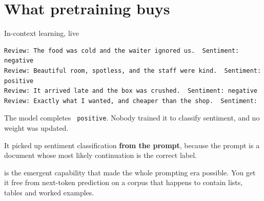 \documentclass[aspectratio=169,10pt]{beamer}
\begin{document}
\section{What pretraining buys}

\begin{frame}[fragile]{In-context learning, live}
\begin{lstlisting}
Review: The food was cold and the waiter ignored us.  Sentiment: negative
Review: Beautiful room, spotless, and the staff were kind.  Sentiment: positive
Review: It arrived late and the box was crushed.  Sentiment: negative
Review: Exactly what I wanted, and cheaper than the shop.  Sentiment:
\end{lstlisting}
  \vspace{0.3em}
  The model completes \texttt{\ positive}. Nobody trained it to classify
  sentiment, and no weight was updated.
  \vspace{0.5em}

  It picked up sentiment classification \textbf{from the prompt}, because the
  prompt is a document whose most likely continuation is the correct label.
  \vspace{0.4em}

   is the emergent capability that made the whole
  prompting era possible. You get it free from next-token prediction on a
  corpus that happens to contain lists, tables and worked examples.
\end{frame}
\end{document}
